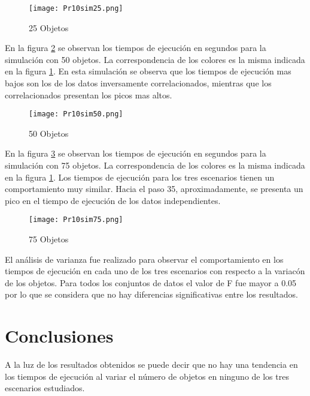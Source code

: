 \documentclass{article}
\begin{document}
\begin{figure}
  \begin{center}
    \texttt{[image: Pr10sim25.png]}
  \end{center}
  \caption{25 Objetos}
  \label{f1}
\end{figure}

En la figura \ref{f2}  se observan los tiempos de ejecuci\'on en segundos para la simulaci\'on con 50 objetos.  La correspondencia de los colores es la misma indicada en la figura \ref{f1}.  En esta simulaci\'on se observa que los tiempos de ejecuci\'on mas bajos son los de los datos inversamente correlacionados, mientras que los correlacionados presentan los picos mas altos.

\begin{figure}
  \begin{center}
    \texttt{[image: Pr10sim50.png]}
  \end{center}
  \caption{50 Objetos}
  \label{f2}
\end{figure}


En la figura \ref{f3}  se observan los tiempos de ejecuci\'on en segundos para la simulaci\'on con 75 objetos.  La correspondencia de los colores es la misma indicada en la figura \ref{f1}.  Los tiempos de ejecuci\'on para los tres escenarios tienen un comportamiento muy similar.  Hacia el paso 35, aproximadamente, se presenta un pico en el tiempo de ejecuci\'on de los datos independientes.

\begin{figure}
  \begin{center}
    \texttt{[image: Pr10sim75.png]}
  \end{center}
  \caption{75 Objetos}
  \label{f3}
\end{figure}

El an\'alisis de varianza fue realizado para observar el comportamiento en los tiempos de ejecuci\'on en cada uno de los tres escenarios con respecto a la variac\'on de los objetos.  Para todos los conjuntos de datos el valor de F fue mayor a 0.05 por lo que se considera que no hay diferencias significativas entre los resultados.


\section{Conclusiones}\label{con}   



A la luz de los resultados obtenidos se puede decir que no hay una tendencia en los tiempos de ejecuci\'on al variar el n\'umero de objetos en ninguno de los tres escenarios estudiados.

\printbibliography
\end{document}
